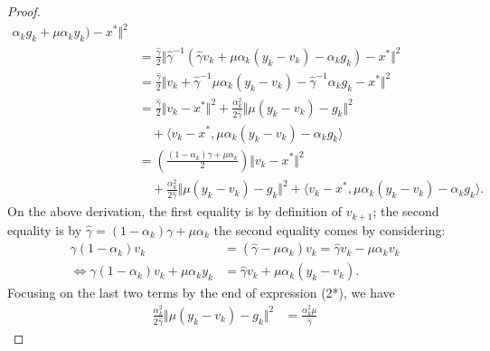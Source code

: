\documentclass[12pt]{article}
\begin{document}
\begin{proof}
\begin{align*}
                    \alpha_k g_k + \mu \alpha_k y_k
                )
                - x^* 
            \Vert^2
            \\
            &=  
            \frac{\hat \gamma}{2}
            \Vert 
                \hat \gamma^{-1}
                (
                \hat \gamma v_k + \mu \alpha_k(y_k - v_k)
                    - \alpha_k g_k
                )
                - x^* 
            \Vert^2
            \\
            &= 
            \frac{\hat \gamma}{2}
            \Vert 
                v_k + \hat \gamma^{-1} \mu \alpha_k (y_k - v_k)
                - \hat \gamma^{-1}\alpha_k g_k
                - x^* 
            \Vert^2
            \\
            &= 
            \frac{\hat \gamma}{2}
            \Vert v_k - x^*\Vert^2 
            + 
            \frac{\alpha_k^2}{2\hat \gamma}\Vert \mu(y_k - v_k) - g_k\Vert^2 
            \\ &\quad 
                + 
                \langle v_k - x^*, \mu \alpha_k(y_k - v_k) - \alpha_k g_k\rangle
            \\
            &= 
            \left(
            \frac{(1 - \alpha_k)\gamma + \mu \alpha_k}{2} 
            \right)\Vert v_k - x^*\Vert^2
            \\ &\quad
                + 
                \frac{\alpha_k^2}{2\hat \gamma}
                \Vert \mu(y_k - v_k) - g_k\Vert^2 
                + 
                \langle v_k - x^*, \mu \alpha_k(y_k - v_k) - \alpha_k g_k\rangle. 
        \tag{2*}
        \end{align*}
        On the above derivation, the first equality is by definition of $v_{k + 1}$; the second equality is by $\hat \gamma = (1 - \alpha_k)\gamma + \mu \alpha_k$ the second equality comes by considering: 
        \begin{align*}
            \gamma(1 - \alpha_k) v_k &= 
            (\hat \gamma  - \mu \alpha_k)v_k
            = \hat \gamma v_k - \mu\alpha_k v_k
            \\
            \iff 
            \gamma(1 - \alpha_k) v_k + \mu \alpha_k y_k
            &= 
            \hat \gamma v_k + \mu \alpha_k(y_k - v_k). 
        \end{align*}
        Focusing on the last two terms by the end of expression (2*), we have  
        \begin{align*}
            \frac{\alpha^2_k}{2\hat \gamma} 
            \Vert \mu(y_k - v_k) - g_k\Vert^2
            & = 
            \frac{\alpha_k^2\mu}{\hat \gamma}

\end{align*}
\end{proof}
\end{document}
